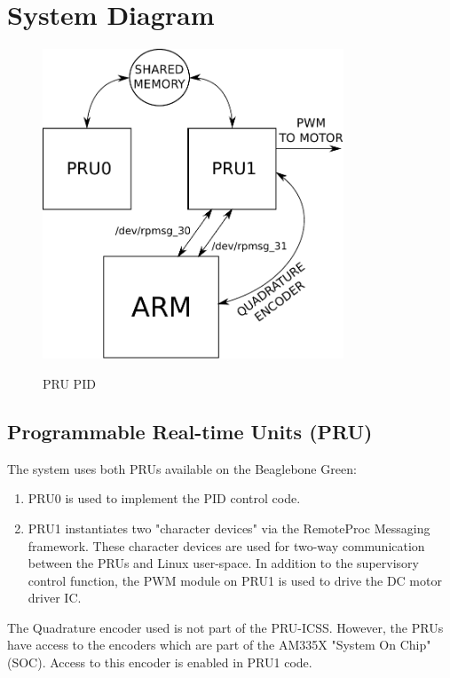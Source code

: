 \chapter{System Diagram}

\begin{figure}[H]
	\centering
	\includegraphics[width=0.8\textwidth]{diagrams/soc_system}
	\centering\bfseries
	\caption{PRU PID}
\end{figure}

\section{Programmable Real-time Units (PRU)}

The system uses both PRUs available on the Beaglebone Green:

\begin{enumerate}
\item PRU0 is used to implement the PID control code.

\item PRU1 instantiates two "character devices" via the RemoteProc Messaging framework.  These character devices are used for two-way communication between the PRUs and Linux user-space.  In addition to the supervisory control function, the PWM module on PRU1 is used to drive the DC motor driver IC.
\end{enumerate}

The Quadrature encoder used is not part of the PRU-ICSS.  However, the PRUs have access to the encoders which are part of the AM335X "System On Chip" (SOC).  Access to this encoder is enabled in PRU1 code.


